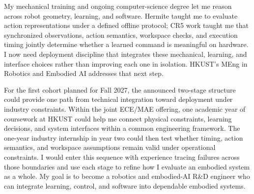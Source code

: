 My mechanical training and ongoing computer-science degree let me reason across robot geometry, learning, and software. Hermite taught me to evaluate action representations under a defined offline protocol; CR5 work taught me that synchronized observations, action semantics, workspace checks, and execution timing jointly determine whether a learned command is meaningful on hardware. I now need deployment discipline that integrates these mechanical, learning, and interface choices rather than improving each one in isolation. HKUST's MEng in Robotics and Embodied AI addresses that next step.

For the first cohort planned for Fall 2027, the announced two-stage structure could provide one path from technical integration toward deployment under industry constraints. Within the joint ECE/MAE offering, one academic year of coursework at HKUST could help me connect physical constraints, learning decisions, and system interfaces within a common engineering framework. The one-year industry internship in year two could then test whether timing, action semantics, and workspace assumptions remain valid under operational constraints. I would enter this sequence with experience tracing failures across those boundaries and use each stage to refine how I evaluate an embodied system as a whole. My goal is to become a robotics and embodied-AI R\&D engineer who can integrate learning, control, and software into dependable embodied systems.
